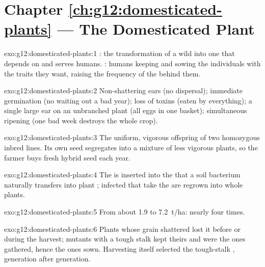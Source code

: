 \section*{Chapter \ref{ch:g12:domesticated-plants} --- The Domesticated Plant}

\begin{solution}{exo:g12:domesticated-plants:1}
: the transformation of a wild  into one that
depends on and serves humans. : humans keeping and
sowing the individuals with the traits they want, raising the
frequency of the  behind them.
\end{solution}

\begin{solution}{exo:g12:domesticated-plants:2}
Non-shattering ears (no dispersal); immediate germination (no waiting
out a bad year); loss of toxins (eaten by everything); a single large
ear on an unbranched plant (all eggs in one basket); simultaneous
ripening (one bad week destroys the whole crop).
\end{solution}

\begin{solution}{exo:g12:domesticated-plants:3}
The uniform, vigorous offspring of two homozygous inbred lines. Its
own seed segregates into a mixture of less vigorous plants, so the
farmer buys fresh hybrid seed each year.
\end{solution}

\begin{solution}{exo:g12:domesticated-plants:4}
The  is inserted into the  that a soil bacterium naturally
transfers into plant ; infected  that take the  are
regrown into whole plants.
\end{solution}

\begin{solution}{exo:g12:domesticated-plants:5}
From about \num{1.9} to \qty{7.2}{t/ha}: nearly four times.
\end{solution}

\begin{solution}{exo:g12:domesticated-plants:6}
Plants whose grain shattered lost it before or during the harvest;
mutants with a tough stalk kept theirs and were the ones gathered,
hence the ones sown. Harvesting itself selected the tough-stalk
, generation after generation.
\end{solution}

